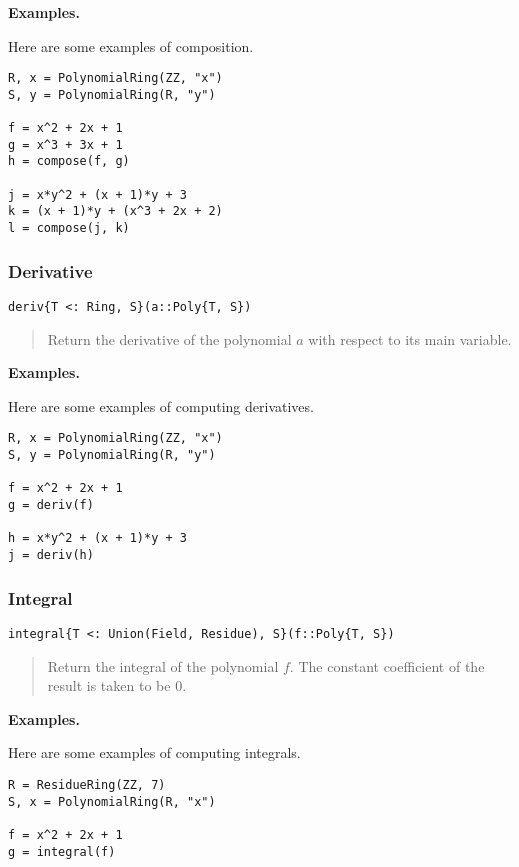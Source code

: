 \documentclass[a4paper,10pt]{article}
\newcommand{\desc}[1]{\vspace{-3mm}\begin{quote}#1\end{quote}}
\begin{document}
{{{\textbf{Examples.}

Here are some examples of composition.

\begin{lstlisting}
R, x = PolynomialRing(ZZ, "x")
S, y = PolynomialRing(R, "y")

f = x^2 + 2x + 1
g = x^3 + 3x + 1
h = compose(f, g)

j = x*y^2 + (x + 1)*y + 3
k = (x + 1)*y + (x^3 + 2x + 2)
l = compose(j, k)
\end{lstlisting}

\subsubsection{Derivative}

\begin{lstlisting}
deriv{T <: Ring, S}(a::Poly{T, S})
\end{lstlisting}

\desc{Return the derivative of the polynomial $a$ with respect to its main
variable.}

\textbf{Examples.}

Here are some examples of computing derivatives.

\begin{lstlisting}
R, x = PolynomialRing(ZZ, "x")
S, y = PolynomialRing(R, "y")

f = x^2 + 2x + 1
g = deriv(f)

h = x*y^2 + (x + 1)*y + 3
j = deriv(h)
\end{lstlisting}

\subsubsection{Integral}

\begin{lstlisting}
integral{T <: Union(Field, Residue), S}(f::Poly{T, S})
\end{lstlisting}

\desc{Return the integral of the polynomial $f$. The constant coefficient of
the result is taken to be $0$.}

\textbf{Examples.}

Here are some examples of computing integrals.

\begin{lstlisting}
R = ResidueRing(ZZ, 7)
S, x = PolynomialRing(R, "x")

f = x^2 + 2x + 1
g = integral(f)
\end{lstlisting}

}}}
\end{document}
